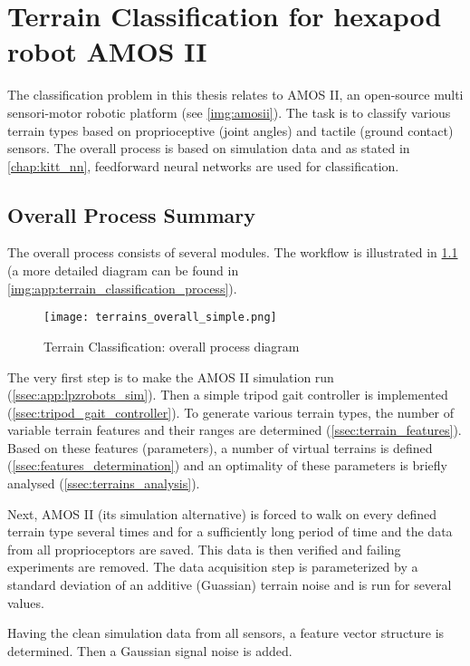 \chapter{Terrain Classification for hexapod robot AMOS II} \label{chap:terrain_classification}

The classification problem in this thesis relates to AMOS II, an open-source multi sensori-motor robotic platform (see \cref{img:amosii}). The task is to classify various terrain types based on proprioceptive (joint angles) and tactile (ground contact) sensors. The overall process is based on simulation data and as stated in \cref{chap:kitt_nn}, feedforward neural networks are used for classification.

\section{Overall Process Summary} \label{sec:overall_process_summary}
The overall process consists of several modules. The workflow is illustrated in \cref{img:terrain_overall_simple} (a more detailed diagram can be found in \cref{img:app:terrain_classification_process}).

\begin{figure}[H]
  \centering
  \texttt{[image: terrains\_overall\_simple.png]}
  \caption{Terrain Classification: overall process diagram}
  \label{img:terrain_overall_simple}
\end{figure}

The very first step is to make the AMOS II simulation run (\cref{ssec:app:lpzrobots_sim}). Then a simple tripod gait controller is implemented (\cref{ssec:tripod_gait_controller}). To generate various terrain types, the number of variable terrain features and their ranges are determined (\cref{ssec:terrain_features}). Based on these features (parameters), a number of virtual terrains is defined (\cref{ssec:features_determination}) and an optimality of these parameters is briefly analysed (\cref{ssec:terrains_analysis}).

Next, AMOS II (its simulation alternative) is forced to walk on every defined terrain type several times and for a sufficiently long period of time and the data from all proprioceptors are saved. This data is then verified and failing experiments are removed. The data acquisition step is parameterized by a standard deviation of an additive (Guassian) terrain noise and is run for several values.

Having the clean simulation data from all sensors, a feature vector structure is determined. Then a Gaussian signal noise is added. 

